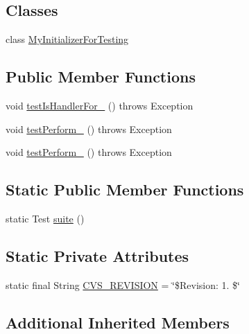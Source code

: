 \subsection*{Classes}
\begin{DoxyCompactItemize}
\item 
class \hyperlink{classorg_1_1jgap_1_1impl_1_1_default_initializer_test_1_1_my_initializer_for_testing}{My\-Initializer\-For\-Testing}
\end{DoxyCompactItemize}
\subsection*{Public Member Functions}
\begin{DoxyCompactItemize}
\item 
void \hyperlink{classorg_1_1jgap_1_1impl_1_1_default_initializer_test_a3c47d2a9562e607e966cb29bf0487f57}{test\-Is\-Handler\-For\-\_} ()  throws Exception 
\item 
void \hyperlink{classorg_1_1jgap_1_1impl_1_1_default_initializer_test_ae0f41e3e1b8ba475b2846748335d9c8f}{test\-Perform\-\_} ()  throws Exception 
\item 
void \hyperlink{classorg_1_1jgap_1_1impl_1_1_default_initializer_test_af88735b99ae447a9d6fed7fcdf06bb3b}{test\-Perform\-\_} ()  throws Exception 
\end{DoxyCompactItemize}
\subsection*{Static Public Member Functions}
\begin{DoxyCompactItemize}
\item 
static Test \hyperlink{classorg_1_1jgap_1_1impl_1_1_default_initializer_test_a6157803d062f587b328a8e045ff3a8b6}{suite} ()
\end{DoxyCompactItemize}
\subsection*{Static Private Attributes}
\begin{DoxyCompactItemize}
\item 
static final String \hyperlink{classorg_1_1jgap_1_1impl_1_1_default_initializer_test_a3028af9f47136b53ca21d95d0c98de46}{C\-V\-S\-\_\-\-R\-E\-V\-I\-S\-I\-O\-N} = \char`\"{}\$Revision\-: 1. \$\char`\"{}
\end{DoxyCompactItemize}
\subsection*{Additional Inherited Members}


